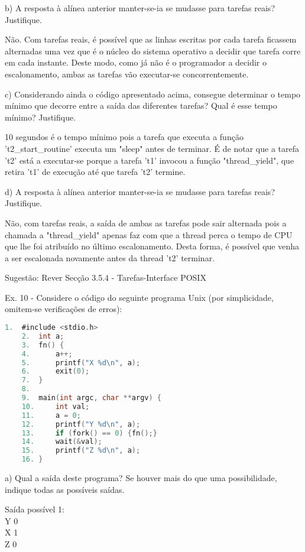 \documentclass[11pt]{article}
\begin{document}
b) A resposta à alínea anterior manter-se-ia se mudasse para tarefas reais? Justifique.

Não. Com tarefas reais, é possível que as linhas escritas por cada tarefa ficassem alternadas uma vez que é o núcleo do sistema operativo a decidir que tarefa corre em cada instante. Deste modo, como já não é o programador a decidir o escalonamento, ambas as tarefas vão executar-se concorrentemente.

c) Considerando ainda o código apresentado acima, consegue determinar o tempo mínimo que decorre entre a saída das diferentes tarefas? Qual é esse tempo mínimo? Justifique.

10 segundos é o tempo mínimo pois a tarefa que executa a função 't2\_start\_routine' executa um "sleep" antes de terminar. É de notar que a tarefa 't2' está a executar-se porque a tarefa 't1' invocou a função "thread\_yield", que retira 't1' de execução até que tarefa 't2' termine.

d) A resposta à alínea anterior manter-se-ia se mudasse para tarefas reais? Justifique.

Não, com tarefas reais, a saída de ambas as tarefas pode sair alternada pois a chamada a "thread\_yield" apenas faz com que a thread perca o tempo de CPU que lhe foi atribuído no último escalonamento. Desta forma, é possível que venha a ser escalonada novamente antes da thread 't2' terminar.

Sugestão: Rever Secção 3.5.4 - Tarefas-Interface POSIX

Ex. 10 - Considere o código do seguinte programa Unix (por simplicidade, omitem-se verificações de erros):

\begin{lstlisting}[language=C]
    1.  #include <stdio.h>
    2.  int a;
    3.  fn() {
    4.      a++;
    5.      printf("X %d\n", a);
    6.      exit(0);
    7.  }
    8.
    9.  main(int argc, char **argv) {
    10.     int val;
    11.     a = 0;
    12.     printf("Y %d\n", a);
    13.     if (fork() == 0) {fn();}
    14.     wait(&val);
    15.     printf("Z %d\n", a);
    16. }
\end{lstlisting}

a) Qual a saída deste programa? Se houver mais do que uma possibilidade, indique todas as possíveis saídas.

Saída possível 1: \\
Y 0 \\
X 1 \\
Z 0 \\
\end{document}

